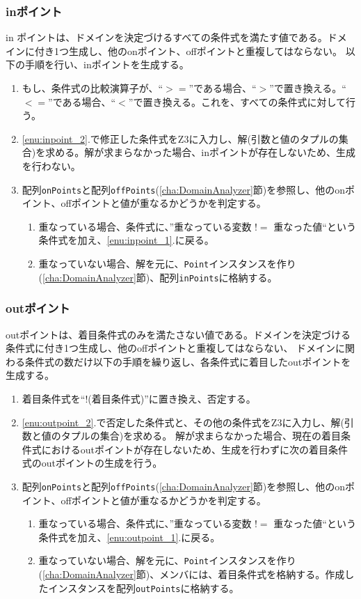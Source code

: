 \documentclass[uplatex, report, a4j, 10pt]{jsbook}
\newcommand\ttt[1]{\texttt{#1}}
\begin{document}
\subsubsection{inポイント}
in ポイントは、ドメインを決定づけるすべての条件式を満たす値である。ドメインに付き1つ生成し、他のonポイント、offポイントと重複してはならない。
以下の手順を行い、inポイントを生成する。
\begin{enumerate}
  \item\label{enu:inpoint_2} もし、条件式の比較演算子が、“$>=$”である場合、“$>$”で置き換える。“$<=$”である場合、“$<$”で置き換える。これを、すべての条件式に対して行う。
  \item\label{enu:inpoint_1} \ref{enu:inpoint_2}.で修正した条件式をZ3に入力し、解(引数と値のタプルの集合)を求める。解が求まらなかった場合、inポイントが存在しないため、生成を行わない。
  \item 配列\ttt{onPoints}と配列\ttt{offPoints}(\ref{cha:DomainAnalyzer}節)を参照し、他のonポイント、offポイントと値が重なるかどうかを判定する。
        \begin{enumerate}
          \item 重なっている場合、条件式に、”重なっている変数 $!=$ 重なった値“という条件式を加え、\ref{enu:inpoint_1}.に戻る。
          \item 重なっていない場合、解を元に、\ttt{Point}インスタンスを作り(\ref{cha:DomainAnalyzer}節)、配列\ttt{inPoints}に格納する。
        \end{enumerate}
\end{enumerate}

\subsubsection{outポイント}
outポイントは、着目条件式のみを満たさない値である。ドメインを決定づける条件式に付き1つ生成し、他のoffポイントと重複してはならない、
ドメインに関わる条件式の数だけ以下の手順を繰り返し、各条件式に着目したoutポイントを生成する。
\begin{enumerate}
  \item\label{enu:outpoint_2} 着目条件式を“$!$(着目条件式)”に置き換え、否定する。
  \item\label{enu:outpoint_1} \ref{enu:outpoint_2}.で否定した条件式と、その他の条件式をZ3に入力し、解(引数と値のタプルの集合)を求める。
        解が求まらなかった場合、現在の着目条件式におけるoutポイントが存在しないため、生成を行わずに次の着目条件式のoutポイントの生成を行う。
  \item 配列\ttt{onPoints}と配列\ttt{offPoints}(\ref{cha:DomainAnalyzer}節)を参照し、他のonポイント、offポイントと値が重なるかどうかを判定する。
        \begin{enumerate}
          \item 重なっている場合、条件式に、”重なっている変数 $!=$ 重なった値“という条件式を加え、\ref{enu:outpoint_1}.に戻る。
          \item 重なっていない場合、解を元に、\ttt{Point}インスタンスを作り(\ref{cha:DomainAnalyzer}節)、メンバ\forcusedConditionalExpression{}には、着目条件式を格納する。作成したインスタンスを配列\ttt{outPoints}に格納する。
        \end{enumerate}
\end{enumerate}
\end{document}
